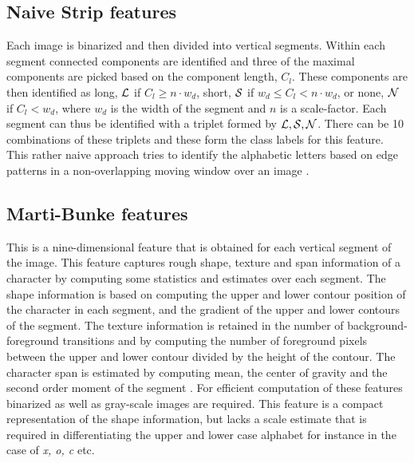 \documentclass[runningheads]{llncs}
\def\L{{\cal L}}
\def\S{{\cal S}}
\def\N{{\cal N}}
\begin{document}
\subsection{Naive Strip features}
\label{ssec:nsf}
Each image is binarized and then divided into vertical segments. Within each segment connected components are identified and three of the maximal components are picked based on the component length, $C_l$. These components are then identified as long, $\L$ if $C_l \ge n\cdot w_d$, short, $\S$ if $w_d \le C_l < n \cdot w_d$, or none, $\N$ if $ C_l < w_d$, where $w_d$ is the width of the segment and $n$ is a scale-factor. Each segment can thus be identified with a triplet formed by $\L,\S,\N$. There can be 10 combinations of these triplets and these form the class labels for this feature.
This rather naive approach tries to identify the alphabetic letters based on edge patterns in a non-overlapping moving window over an image  \cite{Cheriet}.



\subsection{Marti-Bunke features}
\label{ssec:mbf}
This is a nine-dimensional feature that is obtained for each vertical segment of the image. This feature captures rough shape, texture and span information of a character by computing some statistics and estimates over each segment. The shape information is based on computing the upper and lower contour position of the character in each segment, and the gradient of the upper and lower contours of the segment. The texture information is retained in the number of background-foreground transitions and by computing the number of foreground pixels between the upper and lower contour divided by the height of the contour. The character span is estimated by computing mean, the center of gravity and the second order moment of the segment \cite{MartiBunke02}. For efficient computation of these features binarized as well as gray-scale images are required. This feature is a compact representation of the shape information, but lacks a scale estimate that is required in differentiating the upper and lower case alphabet for instance in the case  of \emph{x, o, c} etc.
\end{document}

